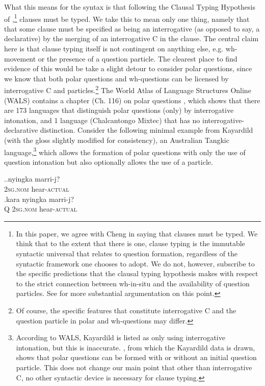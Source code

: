 \documentclass{glossa}
\begin{document}
What this means for the syntax is that following the Clausal Typing Hypothesis of \cite{cheng:1997},\footnote{In this paper, we agree with Cheng in saying that clauses must be typed. We think that to the extent that there is one, clause typing is the immutable syntactic universal that relates to question formation, regardless of the syntactic framework one chooses to adopt. We do not, however, subscribe to the specific predictions that the clausal typing hypothesis makes with respect to the strict connection between wh-in-situ and the availability of question particles. See \cite{bruening:2007} for more substantial argumentation on this point.} clauses must be typed. We take this to mean only one thing, namely that that some clause must be specified as being an interrogative (as opposed to say, a declarative) by the merging of an interrogative C in the clause. The central claim here is that clause typing itself is not contingent on anything else, e.g. wh-movement or the presence of a question particle. The clearest place to find evidence of this would be take a slight detour to consider polar questions, since we know that both polar questions and wh-questions can be licensed by interrogative C and particles.\footnote{Of course, the specific features that constitute interrogative C and the question particle in polar and wh-questions may differ.} The World Atlas of Language Structures Online (WALS) contains a chapter (Ch. 116) on polar questions \citep{wals116:2013}, which shows that there are 173 languages that distinguish polar questions (only) by interrogative intonation, and 1 language (Chalcantongo Mixtec) that has no interrogative-declarative distinction. Consider the following minimal example from Kayardild (with the gloss slightly modified for consistency), an Australian Tangkic language,\footnote{According to WALS, Kayardild is listed as only using interrogative intonation, but this is inaccurate. \cite{evans:1995}, from which the Kayardild data is drawn, shows that polar questions can be formed with or without an initial question particle. This does not change our main point that other than interrogative C, no other syntactic device is necessary for clause typing.} which allows the formation of polar questions with only the use of question intonation but also optionally allows the use of a particle.

\ex.\ag.\label{wh.101a}nyingka marri-j?\\
   \textsc{2sg.nom} hear-\textsc{actual}\\
   \bg.\label{wh.101b}kara nyingka marri-j?\\
   Q \textsc{2sg.nom} hear-\textsc{actual}\\
   \hspace{\fill}\citep[364--365]{evans:1995}
\end{document}
